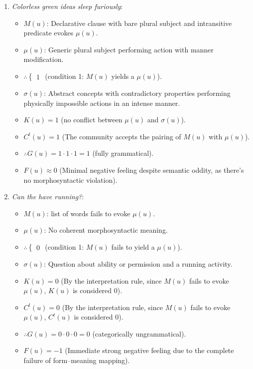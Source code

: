 \begin{enumerate}
    \item \textit{Colorless green ideas sleep furiously}:
    \begin{itemize}
        \item \(M(u)\): Declarative clause with bare plural subject and intransitive predicate evokes \(\mu(u)\).
        \item \(\mu(u)\): Generic plural subject performing action with manner modification.
        \item \(\therefore \begin{cases} 1 \end{cases}\) (condition 1: \(M(u)\) yields a \(\mu(u)\)).
        \item \(\sigma(u)\): Abstract concepts with contradictory properties performing physically impossible actions in an intense manner.
        \item \(K(u) = 1\) (no conflict between \(\mu(u)\) and \(\sigma(u)\)).
        \item \(C^t(u) = 1\) (The community accepts the pairing of \(M(u)\) with \(\mu(u)\)).
        \item \(\therefore G(u) = 1 \cdot 1 \cdot 1 = 1\) (fully grammatical).
        \item \(F(u) \approx 0\) (Minimal negative feeling despite semantic oddity, as there's no morphosyntactic violation).
    \end{itemize}

    \item \textit{Can the have running?}:
    \begin{itemize}
        \item \(M(u)\): list of words fails to evoke \(\mu(u)\).
        \item \(\mu(u)\): No coherent morphosyntactic meaning.
        \item \(\therefore \begin{cases} 0 \end{cases}\) (condition 1: \(M(u)\) fails to yield a \(\mu(u)\)).
        \item \(\sigma(u)\): Question about ability or permission and a running activity.
        \item \(K(u) = 0\) (By the interpretation rule, since \(M(u)\) fails to evoke \(\mu(u)\), \(K(u)\) is considered 0).
        \item \(C^t(u) = 0\) (By the interpretation rule, since \(M(u)\) fails to evoke \(\mu(u)\), \(C^t(u)\) is considered 0).
        \item \(\therefore G(u) = 0 \cdot 0 \cdot 0 = 0\) (categorically ungrammatical).
        \item \(F(u) = -1\) (Immediate strong negative feeling due to the complete failure of form--meaning mapping).
    \end{itemize}


\end{enumerate}
